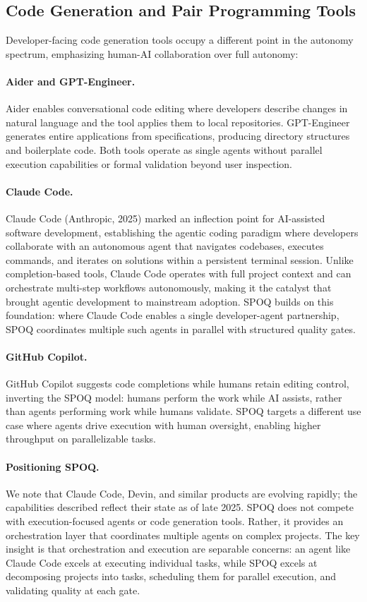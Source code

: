 \subsection{Code Generation and Pair Programming Tools}

Developer-facing code generation tools occupy a different point in the
autonomy spectrum, emphasizing human-AI collaboration over full autonomy:

\paragraph{Aider and GPT-Engineer.}
Aider \citep{aider2024} enables conversational code editing where developers
describe changes in natural language and the tool applies them to local
repositories. GPT-Engineer \citep{gpteng2023} generates entire applications
from specifications, producing directory structures and boilerplate code.
Both tools operate as single agents without parallel execution capabilities
or formal validation beyond user inspection.

\paragraph{Claude Code.}
Claude Code (Anthropic, 2025) marked an inflection point for AI-assisted
software development, establishing the agentic coding paradigm where
developers collaborate with an autonomous agent that navigates codebases,
executes commands, and iterates on solutions within a persistent terminal
session. Unlike completion-based tools, Claude Code operates with full
project context and can orchestrate multi-step workflows autonomously,
making it the catalyst that brought agentic development to mainstream
adoption. SPOQ builds on this foundation: where Claude Code enables a
single developer-agent partnership, SPOQ coordinates multiple such agents
in parallel with structured quality gates.

\paragraph{GitHub Copilot.}
GitHub Copilot \citep{chen2021codex} suggests code completions while humans
retain editing control, inverting the SPOQ model: humans perform the work
while AI assists, rather than agents performing work while humans validate.
SPOQ targets a different use case where agents drive execution with human
oversight, enabling higher throughput on parallelizable tasks.

\paragraph{Positioning SPOQ.}
We note that Claude Code, Devin, and similar products are evolving rapidly;
the capabilities described reflect their state as of late 2025.
SPOQ does not compete with execution-focused agents or code generation tools.
Rather, it provides an orchestration layer that coordinates multiple agents
on complex projects. The key insight is that orchestration and execution are
separable concerns: an agent like Claude Code excels at executing individual
tasks, while SPOQ excels at decomposing projects into tasks, scheduling them
for parallel execution, and validating quality at each gate.
